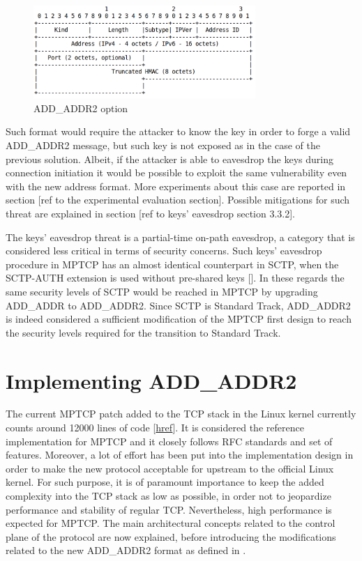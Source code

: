 \begin{figure}[!htb]
\centering
\includegraphics[width=0.75\textwidth]{images/addaddr2}
\caption{ADD\_ADDR2 option}
\label{fig:addaddr2}
\end{figure}

Such format would require the attacker to know the key in order to forge a valid ADD\_ADDR2 message, but such key is not exposed as in the case of the previous solution. Albeit, if the attacker is able to eavesdrop the keys during connection initiation it would be possible to exploit the same vulnerability even with the new address format. More experiments about this case are reported in section [ref to the experimental evaluation section]. Possible mitigations for such threat are explained in section [ref to keys' eavesdrop section 3.3.2].

The keys' eavesdrop threat is a partial-time on-path eavesdrop, a category that is considered less critical in terms of security concerns. Such keys' eavesdrop procedure in MPTCP has an almost identical counterpart in SCTP, when the SCTP-AUTH extension is used without pre-shared keys []. In these regards the same security levels of SCTP would be reached in MPTCP by upgrading ADD\_ADDR to ADD\_ADDR2. Since SCTP is Standard Track, ADD\_ADDR2 is indeed considered a sufficient modification of the MPTCP first design to reach the security levels required for the transition to Standard Track.

\section{Implementing ADD\_ADDR2}
The current MPTCP patch added to the TCP stack in the Linux kernel currently counts around 12000 lines of code [\href{http://multipath-tcp.org/mptcp_stats/index.html}{href}]. It is considered the reference implementation for MPTCP and it closely follows RFC standards and set of features. Moreover, a lot of effort has been put into the implementation design in order to make the new protocol acceptable for upstream to the official Linux kernel. For such purpose, it is of paramount importance to keep the added complexity into the TCP stack as low as possible, in order not to jeopardize performance and stability of regular TCP. Nevertheless, high performance is expected for MPTCP. The main architectural concepts related to the control plane of the protocol are now explained, before introducing the modifications related to the new ADD\_ADDR2 format as defined in . 

